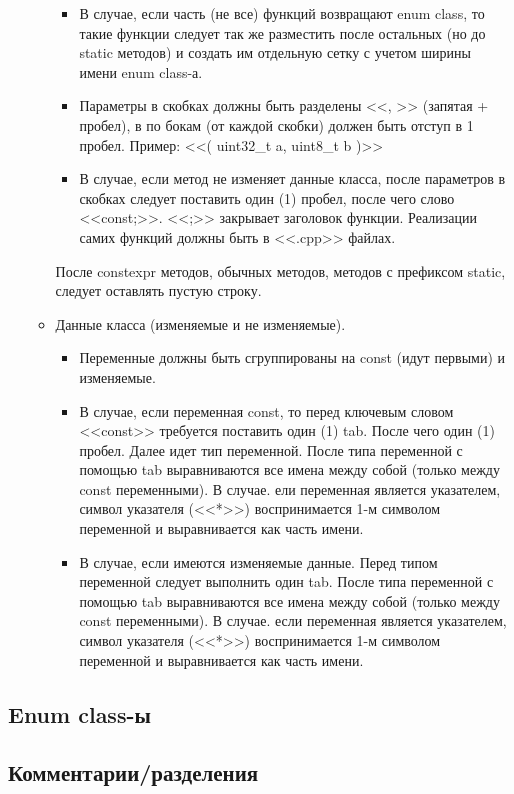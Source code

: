 \begin{enumerate}
\begin{itemize}
\begin{itemize}
		\item В случае, если часть (не все) функций возвращают enum class, то такие функции следует так же разместить после остальных (но до static методов) и создать им отдельную сетку с учетом ширины имени enum class-а.
		\item Параметры в скобках должны быть разделены <<, >> (запятая + пробел), в по бокам (от каждой скобки) должен быть отступ в 1 пробел. Пример: <<( uint32\_t a, uint8\_t b )>>
		\item В случае, если метод не изменяет данные класса, после параметров в скобках следует поставить один (1) пробел, после чего слово <<const;>>. <<;>> закрывает заголовок функции. Реализации самих функций должны быть в <<.cpp>> файлах.
	\end{itemize}
	После constexpr методов, обычных методов, методов с префиксом static, следует оставлять пустую строку. 
	\item Данные класса (изменяемые и не изменяемые).
	\begin{itemize}
		\item Переменные должны быть сгруппированы на const (идут первыми) и изменяемые.
		\item В случае, если переменная const, то перед ключевым словом <<const>> требуется поставить один (1) tab. После чего один (1) пробел. Далее идет тип переменной. После типа переменной с помощью tab выравниваются все имена между собой (только между const переменными). В случае. ели переменная является указателем, символ указателя (<<*>>) воспринимается 1-м символом переменной и выравнивается как часть имени.
		\item В случае, если имеются изменяемые данные. Перед типом переменной следует выполнить один tab. После типа переменной с помощью tab выравниваются все имена между собой (только между const переменными). В случае. если переменная является указателем, символ указателя (<<*>>) воспринимается 1-м символом переменной и выравнивается как часть имени.
	\end{itemize}
\end{itemize}
\end{enumerate}

\subsection{Enum class-ы}
\subsection{Комментарии/разделения}

